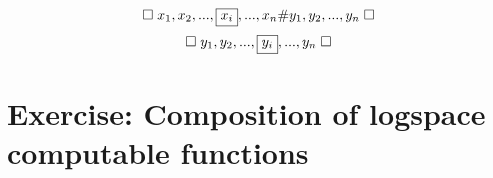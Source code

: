 \documentclass[a4paper, 10pt]{article}
\begin{document}
\[
    \square \hspace{1mm} x_1,x_2,...,\boxed{x_i},...,x_n \# y_1,y_2,...,y_n \hspace{1mm} \square
\]
\[
    \square \hspace{1mm} y_1,y_2,...,\boxed{y_i},...,y_n \hspace{1mm} \square   
\]

\section{Exercise: Composition of logspace computable functions}


%

\newpage


\end{document}
